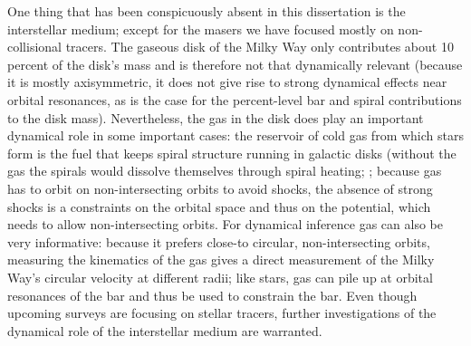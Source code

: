 One thing that has been conspicuously absent in this dissertation is
the interstellar medium; except for the masers we have focused mostly
on non-collisional tracers. The gaseous disk of the Milky Way only
contributes about 10\,percent of the disk's mass and is therefore not
that dynamically relevant (because it is mostly axisymmetric, it does
not give rise to strong dynamical effects near orbital resonances, as
is the case for the percent-level bar and spiral contributions to the
disk mass). Nevertheless, the gas in the disk does play an important
dynamical role in some important cases: the reservoir of cold gas from
which stars form is the fuel that keeps spiral structure running in
galactic disks (without the gas the spirals would dissolve themselves
through spiral heating; \citealt{Carlberg85a}; because gas has to
orbit on non-intersecting orbits to avoid shocks, the absence of
strong shocks is a constraints on the orbital space and thus on the
potential, which needs to allow non-intersecting orbits. For dynamical
inference gas can also be very informative: because it prefers
close-to circular, non-intersecting orbits, measuring the kinematics
of the gas gives a direct measurement of the Milky Way's circular
velocity at different radii; like stars, gas can pile up at orbital
resonances of the bar and thus be used to constrain the bar. Even
though upcoming surveys are focusing on stellar tracers, further
investigations of the dynamical role of the interstellar medium are
warranted.
